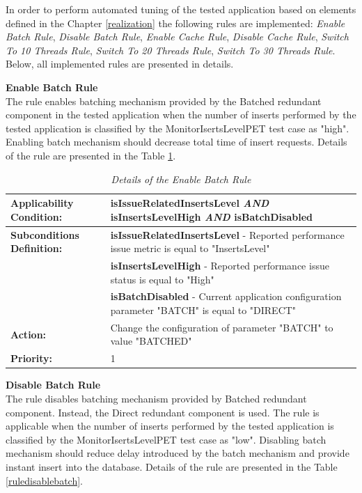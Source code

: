 \documentclass[12pt,a4paper]{article}
\begin{document}
In order to perform automated tuning of the tested application based on elements defined in the Chapter \ref{realization} the following rules are implemented: \textit{Enable Batch Rule}, \textit{Disable Batch Rule}, \textit{Enable Cache Rule}, \textit{Disable Cache Rule}, \textit{Switch To 10 Threads Rule}, \textit{Switch To 20 Threads Rule}, \textit{Switch To 30 Threads Rule}. Below, all implemented rules are presented in details.  

\vspace{5mm}

\noindent\textbf{Enable Batch Rule} \\
The rule enables batching mechanism provided by the Batched redundant component in the tested application when the number of  inserts performed by the tested application is classified by the MonitorIsertsLevelPET test case as "high". Enabling batch mechanism should decrease total time of insert requests. Details of the rule are presented in the Table \ref{ruleenablebatch}.

\begin{table}[!htb]
\def\arraystretch{1.5}
\caption{\textit{Details of the Enable Batch Rule}} \label{ruleenablebatch}
\begin{tabularx}{\textwidth}{p{2.1cm}|X}

\textbf{Applicability Condition:} & \textbf{isIssueRelatedInsertsLevel} \textit{AND} \newline
\textbf{isInsertsLevelHigh} \textit{AND} \newline
\textbf{isBatchDisabled} \\ \hline

\textbf{Subconditions Definition:} & \textbf{isIssueRelatedInsertsLevel} -  Reported performance issue metric is equal to "InsertsLevel"  \\
& \textbf{isInsertsLevelHigh} - Reported performance issue status is equal to "High" \\
& \textbf{isBatchDisabled} - Current application configuration parameter "BATCH" is equal to "DIRECT" \\ \hline

\textbf{Action:} & Change the configuration of parameter "BATCH" to value "BATCHED" \\ \hline
\textbf{Priority:} & 1\\
\end{tabularx}
\end{table}

\vspace{5mm}
\noindent\textbf{Disable Batch Rule} \\
The rule disables batching mechanism provided by Batched redundant component. Instead, the Direct redundant component is used.  The rule is applicable when the number of inserts performed by the tested application is classified by the MonitorIsertsLevelPET test case as "low". Disabling batch mechanism should reduce delay introduced by the batch mechanism and provide instant insert into the database. Details of the rule are presented in the Table \ref{ruledisablebatch}.
\end{document}
